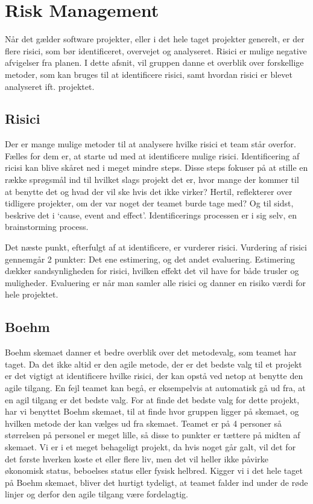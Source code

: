\chapter{Risk Management}\label{ch:Risk Management}

Når det gælder software projekter, eller i det hele taget projekter generelt, er der flere risici, som bør identificeret, overvejet og analyseret. Risici er mulige negative afvigelser fra planen.\cite{SlideRiskAnalysis} I dette afsnit, vil gruppen danne et overblik over forskellige metoder, som kan bruges til at identificere risici, samt hvordan risici er blevet analyseret ift. projektet.

\section{Risici}

Der er mange mulige metoder til at analysere hvilke risici et team står overfor. Fælles for dem er, at starte ud med at identificere mulige risici.
Identificering af ricisi kan blive skåret ned i meget mindre steps. \cite{SlideRiskAnalysis} Disse steps fokuser på at stille en række sprøgsmål ind til hvilket slags projekt det er, hvor mange der kommer til at benytte det og hvad der vil ske hvis det ikke virker? Hertil, reflekterer over tidligere projekter, om der var noget der teamet burde tage med? Og til sidst, beskrive det i ‘cause, event and effect’. Identificerings processen er i sig selv, en brainstorming process.

Det næste punkt, efterfulgt af at identificere, er vurderer risici. Vurdering af risici gennemgår 2 punkter: Det ene estimering, og det andet evaluering. Estimering dækker sandsynligheden for risici, hvilken effekt det vil have for både trusler og muligheder. Evaluering er når man samler alle risici og danner en risiko værdi for hele projektet.

\section{Boehm}

Boehm skemaet danner et bedre overblik over det metodevalg, som teamet har taget. Da det ikke altid er den agile metode, der er det bedste valg til et projekt er det vigtigt at identificere hvilke risici, der kan opstå ved netop at benytte den agile tilgang. En fejl teamet kan begå, er eksempelvis at automatisk gå ud fra, at en agil tilgang er det bedste valg. For at finde det bedste valg for dette projekt, har vi benyttet Boehm skemaet, til at finde hvor gruppen ligger på skemaet, og hvilken metode der kan vælges ud fra skemaet.
Teamet er på 4 personer så størrelsen på personel er meget lille, så disse to punkter er tættere på midten af skemaet. Vi er i et meget behageligt projekt, da hvis noget går galt, vil det for det første hverken koste et eller flere liv, men det vil heller ikke påvirke økonomisk status, beboelses status eller fysisk helbred. Kigger vi i det hele taget på Boehm skemaet, bliver det hurtigt tydeligt, at teamet falder ind under de røde linjer og derfor den agile tilgang være fordelagtig.

